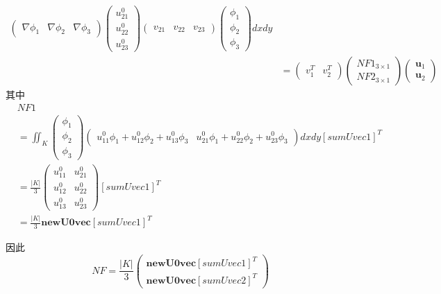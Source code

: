 \documentclass{ctexart}
\begin{document}
\begin{align*}
    \begin{pmatrix}
     \nabla \phi_1 & \nabla \phi_2 & \nabla \phi_3
    \end{pmatrix}
    \begin{pmatrix}
     u_{21}^0\\
     u_{22}^0\\
     u_{23}^0
    \end{pmatrix}
    \begin{pmatrix}
     v_{21} & v_{22} & v_{23}
    \end{pmatrix}
    \begin{pmatrix}
     \phi_1\\
     \phi_2\\
    \phi_3
    \end{pmatrix}dxdy\\
    & = \begin{pmatrix}
      v_1^T& v_2^T
    \end{pmatrix}
    \begin{pmatrix}
      NF1_{3 \times 1}\\
      NF2_{3 \times 1}
    \end{pmatrix}
    \begin{pmatrix}
     \boldsymbol{u}_1\\
     \boldsymbol{u}_2
    \end{pmatrix}
\end{align*}
其中
\begin{align*}
    & NF1\\
 & =\iint_K
 \begin{pmatrix}
  \phi_1\\
  \phi_2\\
 \phi_3
 \end{pmatrix} 
 \begin{pmatrix}
   u_{11}^0\phi_1 + u_{12}^0\phi_2 + u_{13}^0\phi_3&
 u_{21}^0\phi_1 + u_{22}^0\phi_2 + u_{23}^0\phi_3
 \end{pmatrix}dxdy
 [sumUvec1]^T
 \\
 & = \frac{|K|}{3}
 \begin{pmatrix}
   u_{11}^0 &  u_{21}^0 \\
    u_{12}^0 &  u_{22}^0 \\
    u_{13}^0 &  u_{23}^0
 \end{pmatrix}[sumUvec1]^T\\
 & = \frac{|K|}{3}\mathbf{newU0vec}  [sumUvec1]^T
 \end{align*}

因此
$$
NF= \frac{|K|}{3}\begin{pmatrix}
    \mathbf{newU0vec} [sumUvec1]^T\\
    \mathbf{newU0vec} [sumUvec2]^T
\end{pmatrix}
$$
\end{document}
